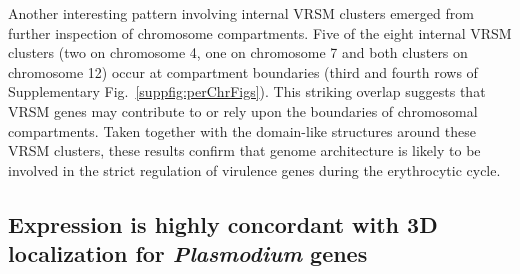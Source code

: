 Another interesting pattern involving internal VRSM clusters emerged from further inspection of chromosome compartments.  Five of the eight internal VRSM clusters (two on chromosome 4, one on chromosome 7 and both clusters on chromosome 12) occur at compartment boundaries (third and fourth rows of Supplementary Fig.~\ref*{suppfig:perChrFigs}). This striking overlap  suggests that VRSM genes may contribute to or rely upon the boundaries of chromosomal compartments. Taken together with the domain-like structures around these VRSM clusters, these results confirm that genome architecture is likely to be involved in the strict regulation of virulence genes during the erythrocytic cycle.

\subsection*{Expression is highly concordant with 3D localization for {\em Plasmodium} genes}

